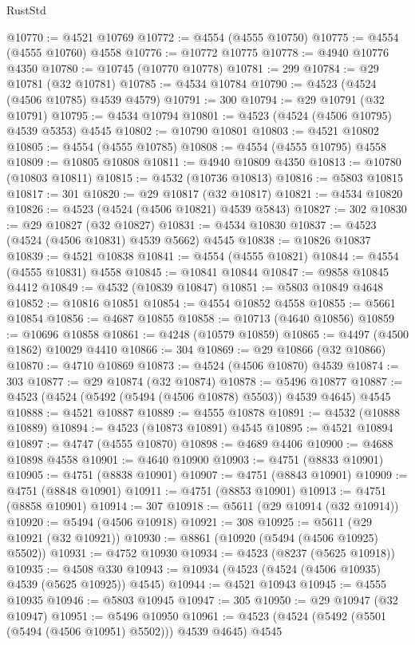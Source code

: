 \begin{lexlean}{RustStd}
\begin{coremodule}
@10770 := @4521 @10769
@10772 := @4554 (@4555 @10750)
@10775 := @4554 (@4555 @10760) @4558
@10776 := @10772 @10775
@10778 := @4940 @10776 @4350
@10780 := @10745 (@10770 @10778)
@10781 := 299
@10784 := @29 @10781 (@32 @10781)
@10785 := @4534 @10784
@10790 := @4523 (@4524 (@4506 @10785) @4539 @4579)
@10791 := 300
@10794 := @29 @10791 (@32 @10791)
@10795 := @4534 @10794
@10801 := @4523 (@4524 (@4506 @10795) @4539 @5353) @4545
@10802 := @10790 @10801
@10803 := @4521 @10802
@10805 := @4554 (@4555 @10785)
@10808 := @4554 (@4555 @10795) @4558
@10809 := @10805 @10808
@10811 := @4940 @10809 @4350
@10813 := @10780 (@10803 @10811)
@10815 := @4532 (@10736 @10813)
@10816 := @5803 @10815
@10817 := 301
@10820 := @29 @10817 (@32 @10817)
@10821 := @4534 @10820
@10826 := @4523 (@4524 (@4506 @10821) @4539 @5843)
@10827 := 302
@10830 := @29 @10827 (@32 @10827)
@10831 := @4534 @10830
@10837 := @4523 (@4524 (@4506 @10831) @4539 @5662) @4545
@10838 := @10826 @10837
@10839 := @4521 @10838
@10841 := @4554 (@4555 @10821)
@10844 := @4554 (@4555 @10831) @4558
@10845 := @10841 @10844
@10847 := @9858 @10845 @4412
@10849 := @4532 (@10839 @10847)
@10851 := @5803 @10849 @4648
@10852 := @10816 @10851
@10854 := @4554 @10852 @4558
@10855 := @5661 @10854
@10856 := @4687 @10855
@10858 := @10713 (@4640 @10856)
@10859 := @10696 @10858
@10861 := @4248 (@10579 @10859)
@10865 := @4497 (@4500 @1862) @10029 @4410
@10866 := 304
@10869 := @29 @10866 (@32 @10866)
@10870 := @4710 @10869
@10873 := @4524 (@4506 @10870) @4539
@10874 := 303
@10877 := @29 @10874 (@32 @10874)
@10878 := @5496 @10877
@10887 := @4523 (@4524 (@5492 (@5494 (@4506 @10878) @5503)) @4539 @4645) @4545
@10888 := @4521 @10887
@10889 := @4555 @10878
@10891 := @4532 (@10888 @10889)
@10894 := @4523 (@10873 @10891) @4545
@10895 := @4521 @10894
@10897 := @4747 (@4555 @10870)
@10898 := @4689 @4406
@10900 := @4688 @10898 @4558
@10901 := @4640 @10900
@10903 := @4751 (@8833 @10901)
@10905 := @4751 (@8838 @10901)
@10907 := @4751 (@8843 @10901)
@10909 := @4751 (@8848 @10901)
@10911 := @4751 (@8853 @10901)
@10913 := @4751 (@8858 @10901)
@10914 := 307
@10918 := @5611 (@29 @10914 (@32 @10914))
@10920 := @5494 (@4506 @10918)
@10921 := 308
@10925 := @5611 (@29 @10921 (@32 @10921))
@10930 := @8861 (@10920 (@5494 (@4506 @10925) @5502))
@10931 := @4752 @10930
@10934 := @4523 (@8237 (@5625 @10918))
@10935 := @4508 @330
@10943 := @10934 (@4523 (@4524 (@4506 @10935) @4539 (@5625 @10925)) @4545)
@10944 := @4521 @10943
@10945 := @4555 @10935
@10946 := @5803 @10945
@10947 := 305
@10950 := @29 @10947 (@32 @10947)
@10951 := @5496 @10950
@10961 := @4523 (@4524 (@5492 (@5501 (@5494 (@4506 @10951) @5502))) @4539 @4645) @4545

\end{coremodule}
\end{lexlean}
